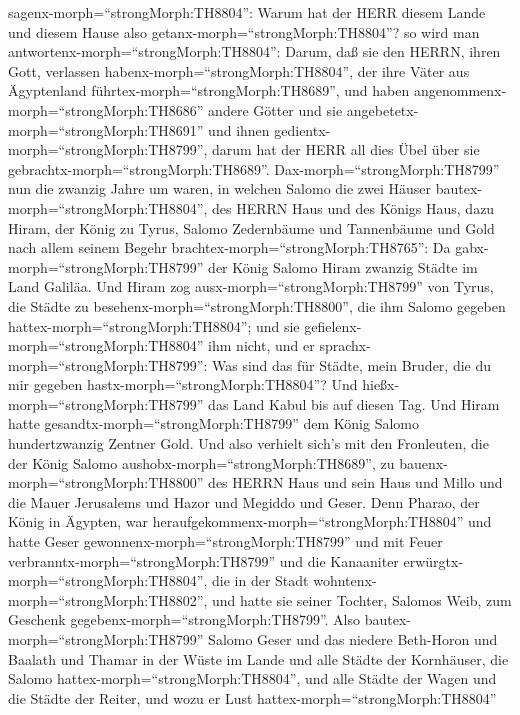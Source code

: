 sagenx-morph=``strongMorph:TH8804'': Warum hat der HERR diesem Lande und
diesem Hause also getanx-morph=``strongMorph:TH8804''?  so
wird man antwortenx-morph=``strongMorph:TH8804'': Darum, daß sie den
HERRN, ihren Gott, verlassen habenx-morph=``strongMorph:TH8804'', der
ihre Väter aus Ägyptenland führtex-morph=``strongMorph:TH8689'', und
haben angenommenx-morph=``strongMorph:TH8686'' andere Götter und sie
angebetetx-morph=``strongMorph:TH8691'' und ihnen
gedientx-morph=``strongMorph:TH8799'', darum hat der HERR all dies Übel
über sie gebrachtx-morph=``strongMorph:TH8689''. 
Dax-morph=``strongMorph:TH8799'' nun die zwanzig Jahre um waren, in
welchen Salomo die zwei Häuser bautex-morph=``strongMorph:TH8804'', des
HERRN Haus und des Königs Haus,  dazu Hiram, der König zu
Tyrus, Salomo Zedernbäume und Tannenbäume und Gold nach allem seinem
Begehr brachtex-morph=``strongMorph:TH8765'': Da
gabx-morph=``strongMorph:TH8799'' der König Salomo Hiram zwanzig Städte
im Land Galiläa.  Und Hiram zog
ausx-morph=``strongMorph:TH8799'' von Tyrus, die Städte zu
besehenx-morph=``strongMorph:TH8800'', die ihm Salomo gegeben
hattex-morph=``strongMorph:TH8804''; und sie
gefielenx-morph=``strongMorph:TH8804'' ihm nicht,  und er
sprachx-morph=``strongMorph:TH8799'': Was sind das für Städte, mein
Bruder, die du mir gegeben hastx-morph=``strongMorph:TH8804''? Und
hießx-morph=``strongMorph:TH8799'' das Land Kabul bis auf diesen Tag.
 Und Hiram hatte gesandtx-morph=``strongMorph:TH8799'' dem
König Salomo hundertzwanzig Zentner Gold.  Und also
verhielt sich's mit den Fronleuten, die der König Salomo
aushobx-morph=``strongMorph:TH8689'', zu
bauenx-morph=``strongMorph:TH8800'' des HERRN Haus und sein Haus und
Millo und die Mauer Jerusalems und Hazor und Megiddo und Geser.
 Denn Pharao, der König in Ägypten, war
heraufgekommenx-morph=``strongMorph:TH8804'' und hatte Geser
gewonnenx-morph=``strongMorph:TH8799'' und mit Feuer
verbranntx-morph=``strongMorph:TH8799'' und die Kanaaniter
erwürgtx-morph=``strongMorph:TH8804'', die in der Stadt
wohntenx-morph=``strongMorph:TH8802'', und hatte sie seiner Tochter,
Salomos Weib, zum Geschenk gegebenx-morph=``strongMorph:TH8799''.
 Also bautex-morph=``strongMorph:TH8799'' Salomo Geser und
das niedere Beth-Horon  und Baalath und Thamar in der Wüste
im Lande  und alle Städte der Kornhäuser, die Salomo
hattex-morph=``strongMorph:TH8804'', und alle Städte der Wagen und die
Städte der Reiter, und wozu er Lust hattex-morph=``strongMorph:TH8804''
